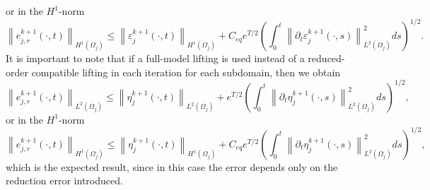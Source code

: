 \documentclass[a4paper, 11pt]{article}
\theoremstyle{remark}
\begin{document}
or in the $H^1$-norm
\begin{equation*}
    \left\lVert e_{j, r}^{k+1}(\cdot, t)\right\rVert_{H^{1}(\Omega_{j})} \leq \left\lVert\varepsilon_{j}^{k+1}(\cdot, t)\right\rVert_{H^{1}(\Omega_{j})} + C_{eq}e^{T/2}\left(\int_{0}^{t}\left\lVert \partial_{t}\varepsilon_{j}^{k+1}(\cdot, s)\right\rVert^{2}_{L^{2}(\Omega_{j})}ds\right)^{1/2}.
\end{equation*}
It is important to note that if a full-model lifting is used instead of a reduced-order compatible lifting in each iteration for each subdomain, then we obtain
\begin{equation*}
    \left\lVert e_{j, r}^{k+1}(\cdot, t)\right\rVert_{L^{2}(\Omega_{j})} \leq \left\lVert\eta_{j}^{k+1}(\cdot, t)\right\rVert_{L^{2}(\Omega_{j})} + e^{T/2}\left(\int_{0}^{t}\left\lVert \partial_{t}\eta_{j}^{k+1}(\cdot, s)\right\rVert^{2}_{L^{2}(\Omega_{j})}ds\right)^{1/2},
\end{equation*}
or in the $H^1$-norm
\begin{equation*}
    \left\lVert e_{j, r}^{k+1}(\cdot, t)\right\rVert_{H^{1}(\Omega_{j})} \leq \left\lVert\eta_{j}^{k+1}(\cdot, t)\right\rVert_{H^{1}(\Omega_{j})} + C_{eq}e^{T/2}\left(\int_{0}^{t}\left\lVert \partial_{t}\eta_{j}^{k+1}(\cdot, s)\right\rVert^{2}_{L^{2}(\Omega_{j})}ds\right)^{1/2},
\end{equation*}
which is the expected result, since in this case the error depends only on the reduction error introduced. 
\end{document}
